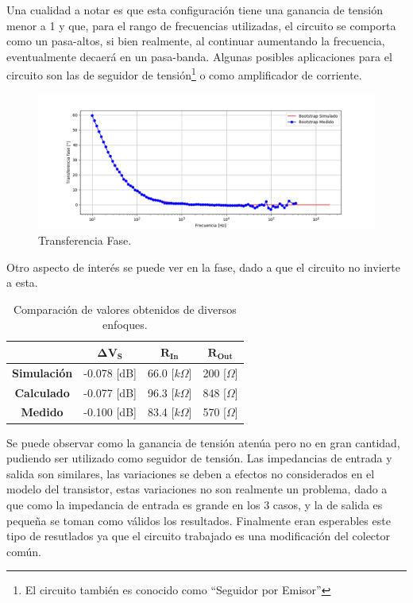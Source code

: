 Una cualidad a notar es que esta configuración tiene una ganancia de tensión menor a 1 y que, para el rango de frecuencias utilizadas, el circuito se comporta como un pasa-altos, si bien realmente, al continuar aumentando la frecuencia, eventualmente decaerá en un pasa-banda. Algunas posibles aplicaciones para el circuito son las de seguidor de tensión\footnote{El circuito también es conocido como ``Seguidor por Emisor''} o como amplificador de corriente.
\begin{figure} [H]
	\centering
	\includegraphics[width=\textwidth]{imagenes/avsp.png}
	\caption{Transferencia Fase.}
	\label{fig:transph}
\end{figure}

Otro aspecto de interés se puede ver en la fase, dado a que el circuito no invierte a esta.
\begin{table}[H]
\centering
\begin{tabular}{cccc}
\hline                   & $\mathbf{\Delta V_S}$ & $\mathbf{R_{In}}$ & $\mathbf{R_{Out}}$ \\
\hline
\textbf{Simulación} & -0.078 [dB]          & 66.0 [$k\Omega$]    & 200 [$\Omega$]     \\
\textbf{Calculado}  & -0.077 [dB]            & 96.3 [$k\Omega$]   & 848 [$\Omega$]     \\
\textbf{Medido}     & -0.100 [dB]             & 83.4 [$k\Omega$]  & 570 [$\Omega$]   	\\
\hline
\end{tabular}
\caption{Comparación de valores obtenidos de diversos enfoques.}
\label{tabla:comparacion}
\end{table}

Se puede observar como la ganancia de tensión atenúa pero no en gran cantidad, pudiendo ser utilizado como seguidor de tensión. Las impedancias de entrada y salida son similares, las variaciones se deben a efectos no considerados en el modelo del transistor, estas variaciones no son realmente un problema, dado a que como la impedancia de entrada es grande en los 3 casos, y la de salida es pequeña se toman como válidos los resultados.
Finalmente eran esperables este tipo de resutlados ya que el circuito trabajado es una modificación del colector común.



